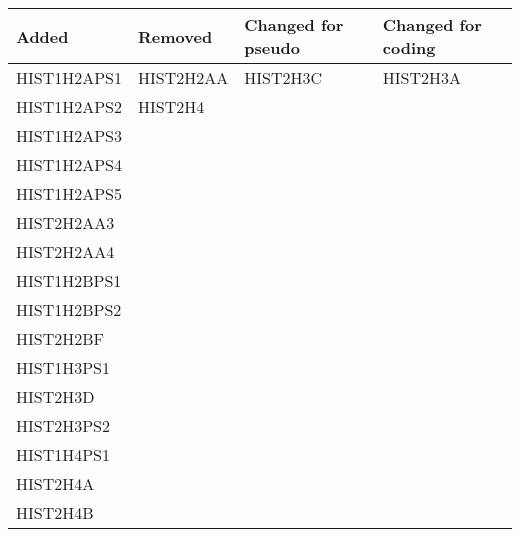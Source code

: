 \begin{tabular}{l | l | l | l }
  Added & Removed & Changed for pseudo & Changed for coding \\
  \hline
  HIST1H2APS1 & HIST2H2AA & HIST2H3C & HIST2H3A \\
  HIST1H2APS2 & HIST2H4 &  &  \\
  HIST1H2APS3 &  &  &  \\
  HIST1H2APS4 &  &  &  \\
  HIST1H2APS5 &  &  &  \\
  HIST2H2AA3 &  &  &  \\
  HIST2H2AA4 &  &  &  \\
  HIST1H2BPS1 &  &  &  \\
  HIST1H2BPS2 &  &  &  \\
  HIST2H2BF &  &  &  \\
  HIST1H3PS1 &  &  &  \\
  HIST2H3D &  &  &  \\
  HIST2H3PS2 &  &  &  \\
  HIST1H4PS1 &  &  &  \\
  HIST2H4A &  &  &  \\
  HIST2H4B &  &  &  \\
\end{tabular}

